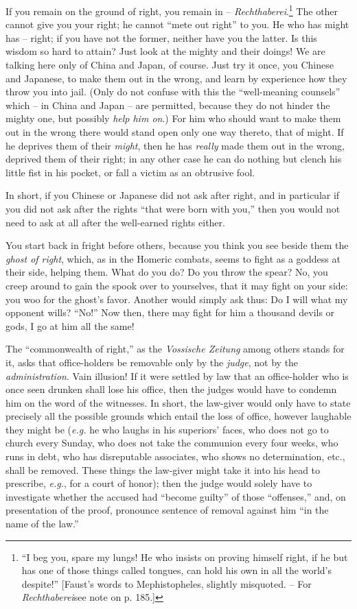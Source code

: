 If you remain on the ground of right, you remain in -- 
\textit{Rechthaberei}.\footnote{``I beg you, spare my lungs! He who insists 
on proving himself right, if he but has one of those things called tongues, 
can hold his own in all the world's despite!'' [Faust's words to 
Mephistopheles, slightly misquoted. -- For \textit{Rechthaberei}see note on p. 
185.]} The other cannot give you your right; he cannot ``mete out right'' to 
you. He who has might has -- right; if you have not the former, neither have 
you the latter. Is this wisdom so hard to attain? Just look at the mighty and 
their doings! We are talking here only of China and Japan, of course. Just try 
it once, you Chinese and Japanese, to make them out in the wrong, and learn by 
experience how they throw you into jail. (Only do not confuse with this the 
``well-meaning counsels'' which -- in China and Japan -- are permitted, 
because they do not hinder the mighty one, but possibly \textit{help him on}.) 
For him who should want to make them out in the wrong there would stand open 
only one way thereto, that of might. If he deprives them of their 
\textit{might}, then he has \textit{really} made them out in the wrong, 
deprived them of their right; in any other case he can do nothing but clench 
his little fist in his pocket, or fall a victim as an obtrusive fool.

In short, if you Chinese or Japanese did not ask after right, and in 
particular if you did not ask after the rights ``that were born with you,'' 
then you would not need to ask at all after the well-earned rights either.

You start back in fright before others, because you think you see beside them 
the \textit{ghost of right}, which, as in the Homeric combats, seems to fight 
as a goddess at their side, helping them. What do you do? Do you throw the 
spear? No, you creep around to gain the spook over to yourselves, that it may 
fight on your side: you woo for the ghost's favor. Another would simply ask 
thus: Do I will what my opponent wills? ``No!'' Now then, there may fight 
for him a thousand devils or gods, I go at him all the same!

The ``commonwealth of right,'' as the \textit{Vossische Zeitung} among 
others stands for it, asks that office-holders be removable only by the 
\textit{judge}, not by the \textit{administration}. Vain illusion! If it were 
settled by law that an office-holder who is once seen drunken shall lose his 
office, then the judges would have to condemn him on the word of the 
witnesses. In short, the law-giver would only have to state precisely all the 
possible grounds which entail the loss of office, however laughable they might 
be (\textit{e.g.} he who laughs in his superiors' faces, who does not go to 
church every Sunday, who does not take the communion every four weeks, who 
runs in debt, who has disreputable associates, who shows no determination, 
etc., shall be removed. These things the law-giver might take it into his head 
to prescribe, \textit{e.g.}, for a court of honor); then the judge would 
solely have to investigate whether the accused had ``become guilty'' of 
those ``offenses,'' and, on presentation of the proof, pronounce sentence of 
removal against him ``in the name of the law.''

